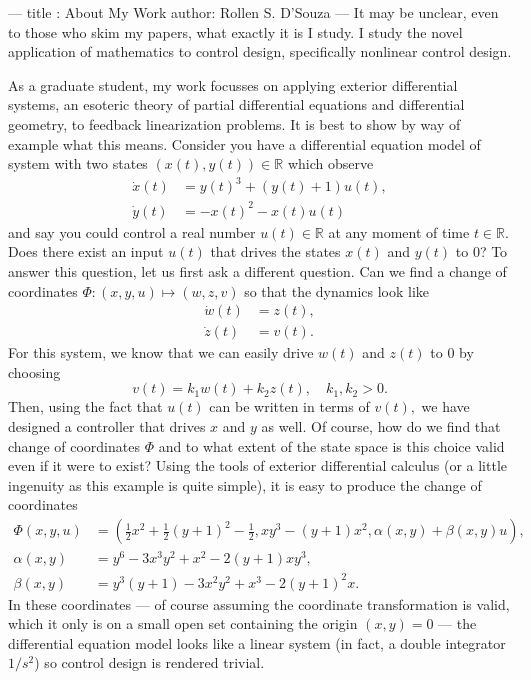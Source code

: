 ---
title : About My Work
author: Rollen S. D'Souza
---
It may be unclear, even to those who skim my papers, what exactly it is I study.
I study the novel application of mathematics to control design, specifically nonlinear control design.

As a graduate student, my work focusses on applying exterior differential systems, an esoteric theory of partial differential equations and differential geometry, to feedback linearization problems.
It is best to show by way of example what this means.
Consider you have a differential equation model of system with two states \((x(t), y(t))\in\mathbb{R}\) which observe
\[
\begin{aligned}
  \dot{x}(t) &= y(t)^3 + (y(t) + 1) u(t),\\
  \dot{y}(t) &= -x(t)^2 - x(t) u(t)
\end{aligned}
\]
and say you could control a real number \(u(t)\in\mathbb{R}\) at any moment of time \(t \in \mathbb{R}.\)
Does there exist an input \(u(t)\) that drives the states \(x(t)\) and \(y(t)\) to \(0\)?
To answer this question, let us first ask a different question.
Can we find a change of coordinates \(\Phi: (x,y,u) \mapsto (w,z,v)\) so that the dynamics look like
\[
\begin{aligned}
  \dot{w}(t) &= z(t),\\
  \dot{z}(t) &= v(t).
\end{aligned}
\]
For this system, we know that we can easily drive \(w(t)\) and \(z(t)\) to \(0\) by choosing
\[
  v(t) = k_1 w(t) + k_2 z(t),\quad k_1, k_2 > 0.
\]
Then, using the fact that \(u(t)\) can be written in terms of \(v(t),\) we have designed a controller that drives \(x\) and \(y\) as well.
Of course, how do we find that change of coordinates \(\Phi\) and to what extent of the state space is this choice valid even if it were to exist?
Using the tools of exterior differential calculus (or a little ingenuity as this example is quite simple), it is easy to produce the change of coordinates
\[
\begin{aligned}
  \Phi(x,y,u) &=
    \left(
      \frac{1}{2}x^2 + \frac{1}{2}(y+1)^2 - \frac{1}{2},
      x y^3 - (y + 1) x^2,
      \alpha(x,y) + \beta(x,y) u
    \right),\\
  \alpha(x,y) &= 
    y^6
    - 3 x^3 y^2
    + x^2
    - 2 (y + 1) x y^3,\\
  \beta(x,y) &=
    y^3 (y + 1)
    - 3 x^2 y^2
    + x^3
    - 2 (y + 1)^2 x.
\end{aligned}
\]
In these coordinates --- of course assuming the coordinate transformation is valid, which it only is on a small open set containing the origin \((x,y) = 0\) --- the differential equation model looks like a linear system (in fact, a double integrator \(1/s^2\)) so control design is rendered trivial.

